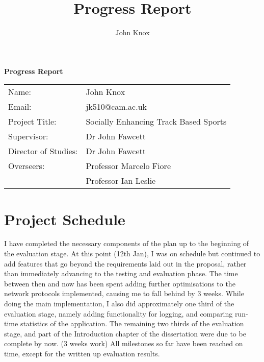 \documentclass{article}
\begin{document}
\title{Progress Report}
\author{John Knox}

\maketitle


\huge{\bf Progress Report\newline}
{\large
\begin{tabular}{ll}
Name:                & John Knox                             \\
Email:               & jk510@cam.ac.uk                       \\
Project Title:       & Socially Enhancing Track Based Sports \\
Supervisor:          & Dr John Fawcett                           \\
Director of Studies: & Dr John Fawcett                           \\
Overseers:           & Professor Marcelo Fiore                   \\
                     & Professor Ian Leslie                      \\
\end{tabular}
}

\normalsize
\section*{Project Schedule}

I have completed the necessary components of the plan up to the beginning of the evaluation stage.
At this point (12th Jan), I was on schedule but continued to add features that go beyond the requirements laid out in the proposal, rather than immediately advancing to the testing and evaluation phase. The time between then and now has been spent adding further optimisations to the network protocols implemented, causing me to fall behind by 3 weeks.
While doing the main implementation, I also did approximately one third of the evaluation stage, namely adding functionality for logging, and comparing run-time statistics of the application. The remaining two thirds of the evaluation stage, and part of the Introduction chapter of the dissertation were due to be complete by now. (3 weeks work)
All milestones so far have been reached on time, except for the written up evaluation results.
\end{document}
